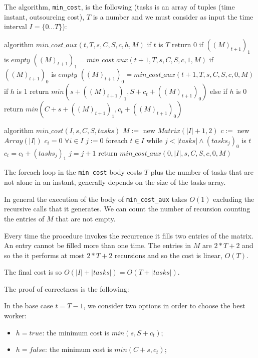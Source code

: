 \documentclass[paper=a4, fontsize=11pt]{scrartcl} %
\numberwithin{equation}{section} %
\numberwithin{figure}{section} %
\numberwithin{table}{section} %
\begin{document}
The algorithm, \verb|min_cost|, is the following (tasks is an array of tuples (time instant, outsourcing cost), $T$ is a number and we must consider as input the time interval $I = \{0 ... T\}$):

\begin{pseudo}
algorithm $min\_cost\_aux(t, T, s, C, S, c, h, M)$
    if $t$ is $T$
        return $0$
    if $((M)_{t+1})_1$ is $empty$
         $((M)_{t+1})_1 = min\_cost\_aux(t+1, T, s, C, S, c, 1, M)$
    if $((M)_{t+1})_0$ is $empty$
         $((M)_{t+1})_0 = min\_cost\_aux(t+1, T, s, C, S, c, 0, M)$
    if $h$ is $1$
        return $min(s + ((M)_{t+1})_1, S + c_t + ((M)_{t+1})_0)$
    else if $h$ is $0$
        return $min(C + s + ((M)_{t+1})_1, c_t + ((M)_{t+1})_0)$
\end{pseudo}
\begin{pseudo}
algorithm $min\_cost(I, s, C, S, tasks)$
    $M :=$ new $Matrix(|I|+1, 2)$
    $c :=$ new $Array(|I|)$
    $c_i = 0$ $\forall i \in I$
    $j := 0$
    foreach $t \in I$
        while $j < |tasks| \land (tasks_j)_0$ is $t$
            $c_t = c_t + (tasks_j)_1$
            $j = j +1$
    return $min\_cost\_aux(0, |I|, s, C, S, c, 0, M)$
\end{pseudo}

The foreach loop in the \verb|min_cost| body costs $T$ plus the number of tasks that are not alone in an instant, generally depends on the size of the tasks array.

In general the execution of the body of \verb|min_cost_aux| takes $O(1)$ excluding the recursive calls that it generates. We can count the number of recursion counting the entries of $M$ that are not empty.

Every time the procedure invokes the recurrence it fills two entries of the matrix. An entry cannot be filled more than one time. The entries in $M$ are $2*T+2$ and so the it performs at most $2*T+2$ recursions and so the cost is linear, $O(T)$.

The final cost is so $O(|I| + |tasks|) = O(T + |tasks|)$.

The proof of correctness is the following:

In the base case $t = T-1$, we consider two options in order to choose the best worker:
\begin{itemize}
    \item $h = true$: the minimum cost is $min(s, S + c_t)$;
    \item $h = false$: the minimum cost is $min(C + s, c_t)$;
\end{itemize}
\end{document}
